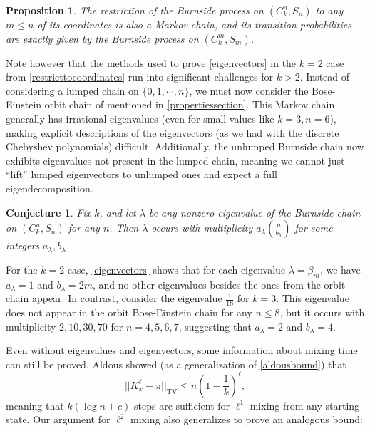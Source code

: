 \documentclass[11pt]{article}
\newcounter{r}
\newcounter{s}
\numberwithin{equation}{section}
\newtheorem{conjecture}[theorem]{Conjecture}
\newtheorem{proposition}[theorem]{Proposition}
\begin{document}
\begin{proposition}\label{restricttocoordinates2}
The restriction of the Burnside process on $(C_k^n, S_n)$ to any $m \le n$ of its coordinates is also a Markov chain, and its transition probabilities are exactly given by the Burnside process on $(C_k^m, S_m)$.
\end{proposition}

Note however that the methods used to prove \cref{eigenvectors} in the $k = 2$ case from \cref{restricttocoordinates} run into significant challenges for $k > 2$. Instead of considering a lumped chain on $\{0, 1, \cdots, n\}$, we must now consider the Bose-Einstein orbit chain of \cite{boseeinstein} mentioned in \cref{propertiessection}. This Markov chain generally has irrational eigenvalues (even for small values like $k = 3, n = 6$), making explicit descriptions of the eigenvectors (as we had with the discrete Chebyshev polynomials) difficult. Additionally, the unlumped Burnside chain now exhibits eigenvalues not present in the lumped chain, meaning we cannot just ``lift'' lumped eigenvectors to unlumped ones and expect a full eigendecomposition. 

\begin{conjecture}\label{ckmultiplicityconjecture}
Fix $k$, and let $\lambda$ be any nonzero eigenvalue of the Burnside chain on $(C_k^n, S_n)$ for any $n$. Then $\lambda$ occurs with multiplicity $a_\lambda \binom{n}{b_\lambda}$ for some integers $a_\lambda, b_\lambda$.
\end{conjecture}

For the $k = 2$ case, \cref{eigenvectors} shows that for each eigenvalue $\lambda = \beta_m$, we have $a_\lambda = 1$ and $b_\lambda = 2m$, and no other eigenvalues besides the ones from the orbit chain appear. In contrast, consider the eigenvalue $\frac{1}{18}$ for $k = 3$. This eigenvalue does not appear in the orbit Bose-Einstein chain for any $n \le 8$, but it occurs with multiplicity $2, 10, 30, 70$ for $n = 4, 5, 6, 7$, suggesting that $a_\lambda = 2$ and $b_\lambda = 4$.

Even without eigenvalues and eigenvectors, some information about mixing time can still be proved. Aldous showed (as a generalization of \cref{aldousbound}) that 
\[
    ||K_x^\ell - \pi||_{\text{TV}} \le n\left(1 - \frac{1}{k}\right)^\ell,
\]
meaning that $k(\log n + c)$ steps are sufficient for $\ell^1$ mixing from any starting state. Our argument for $\ell^2$ mixing also generalizes to prove an analogous bound:
\end{document}
